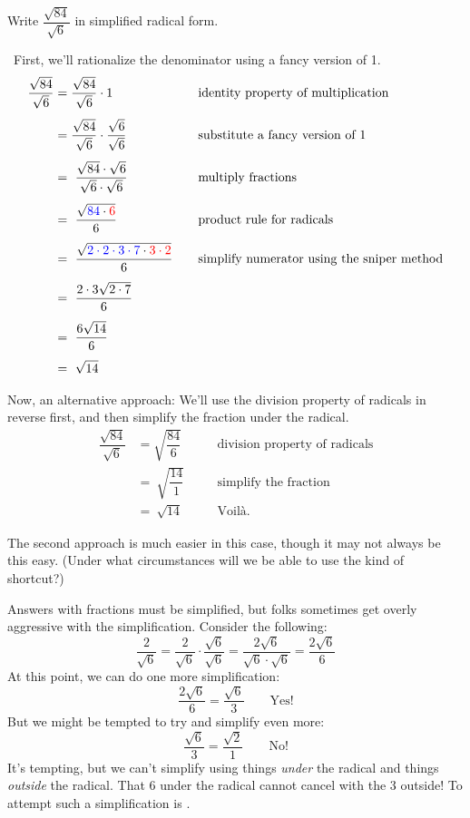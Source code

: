 \begin{boxedex}
Write $\dfrac{\sqrt{84}}{\sqrt{6}}$ in simplified radical form.

\exsoln\ First, we'll rationalize the denominator using a fancy version of 1.
\[\begin{aligned}
\dfrac{\sqrt{84}}{\sqrt{6}} &= \dfrac{\sqrt{84}}{\sqrt{6}} \cdot 1
&&\quad\text{identity property of multiplication}
\\[1ex]
&= \dfrac{\sqrt{84}}{\sqrt{6}} \cdot \dfrac{\sqrt{6}}{\sqrt{6}}
&&\quad\text{substitute a fancy version of 1}
\\[1ex]
&=~ \dfrac{\sqrt{84} \cdot \sqrt{6}}{\sqrt{6} \cdot \sqrt{6}}
&&\quad\text{multiply fractions}
\\[1ex]
&=~ \dfrac{\sqrt{{\color{blue}84} \cdot {\color{red}6}}}{6}
&&\quad\text{product rule for radicals}
\\[1ex]
&=~ \dfrac{\sqrt{{\color{blue}2 \cdot 2 \cdot 3 \cdot 7} \cdot {\color{red}3 \cdot 2}}}{6}
&&\quad\text{simplify numerator using the sniper method}
\\[1ex]
&=~ \dfrac{2 \cdot 3 \sqrt{2 \cdot 7}}{6}
&&\quad\text{}
\\[1ex]
&=~ \dfrac{6 \sqrt{14}}{6}
&&\quad\text{}
\\[1ex]
&=~ \sqrt{14}
&&\quad\text{}\\
\end{aligned}
\]

Now, an alternative approach: We'll use the division property of radicals in reverse first, and then simplify the fraction under the radical.
\[\begin{aligned}
\dfrac{\sqrt{84}}{\sqrt{6}} &= \sqrt{\dfrac{84}{6}}
&&\quad\text{division property of radicals}
\\[1ex]
&=~ \sqrt{\dfrac{14}{1}}
&&\quad\text{simplify the fraction}
\\[1ex]
&=~ \sqrt{14}
&&\quad\text{Voil\`a.}
\end{aligned}
\]
\end{boxedex}

The second approach is much easier in this case, though it may not always be this easy. (Under what circumstances will we be able to use the kind of shortcut?)

\begin{boxedwarning}
Answers with fractions must be simplified, but folks sometimes get overly aggressive with the simplification. Consider the following: \[\frac{2}{\sqrt{6}} = \frac{2}{\sqrt{6}}\cdot\frac{\sqrt{6}}{\sqrt{6}} = \frac{2\sqrt{6}}{\sqrt{6}\cdot\sqrt{6}} = \frac{2\sqrt{6}}{6}\]
At this point, we can do one more simplification: \[\frac{2\sqrt{6}}{6} = \frac{\sqrt{6}}{3} \qquad \text{Yes!}\]
But we might be tempted to try and simplify even more: \[\frac{\sqrt{6}}{3} = \frac{\sqrt{2}}{1} \qquad \text{No!}\]
It's tempting, but we can't simplify using things \textit{under} the radical and things \textit{outside} the radical. That 6 under the radical cannot cancel with the 3 outside! To attempt such a simplification is \evilandwrong.
\end{boxedwarning}

